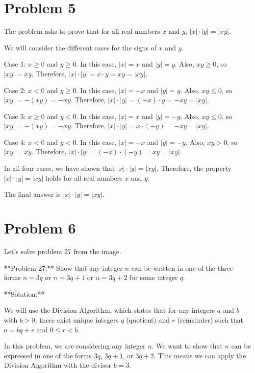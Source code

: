 \documentclass{article}
\begin{document}
\newpage

\section*{Problem 5}
The problem asks to prove that for all real numbers $x$ and $y$, $|x| \cdot |y| = |xy|$.

We will consider the different cases for the signs of $x$ and $y$.

Case 1: $x \ge 0$ and $y \ge 0$.
In this case, $|x| = x$ and $|y| = y$.
Also, $xy \ge 0$, so $|xy| = xy$.
Therefore, $|x| \cdot |y| = x \cdot y = xy = |xy|$.

Case 2: $x < 0$ and $y \ge 0$.
In this case, $|x| = -x$ and $|y| = y$.
Also, $xy \le 0$, so $|xy| = -(xy) = -xy$.
Therefore, $|x| \cdot |y| = (-x) \cdot y = -xy = |xy|$.

Case 3: $x \ge 0$ and $y < 0$.
In this case, $|x| = x$ and $|y| = -y$.
Also, $xy \le 0$, so $|xy| = -(xy) = -xy$.
Therefore, $|x| \cdot |y| = x \cdot (-y) = -xy = |xy|$.

Case 4: $x < 0$ and $y < 0$.
In this case, $|x| = -x$ and $|y| = -y$.
Also, $xy > 0$, so $|xy| = xy$.
Therefore, $|x| \cdot |y| = (-x) \cdot (-y) = xy = |xy|$.

In all four cases, we have shown that $|x| \cdot |y| = |xy|$.
Therefore, the property $|x| \cdot |y| = |xy|$ holds for all real numbers $x$ and $y$.

The final answer is $\boxed{|x| \cdot |y| = |xy|}$.

\newpage

\section*{Problem 6}
Let's solve problem 27 from the image.

**Problem 27:** Show that any integer $n$ can be written in one of the three forms $n=3q$ or $n=3q+1$ or $n=3q+2$ for some integer $q$.

**Solution:**

We will use the Division Algorithm, which states that for any integers $a$ and $b$ with $b > 0$, there exist unique integers $q$ (quotient) and $r$ (remainder) such that $a = bq + r$ and $0 \le r < b$.

In this problem, we are considering any integer $n$. We want to show that $n$ can be expressed in one of the forms $3q$, $3q+1$, or $3q+2$. This means we can apply the Division Algorithm with the divisor $b=3$.
\end{document}
